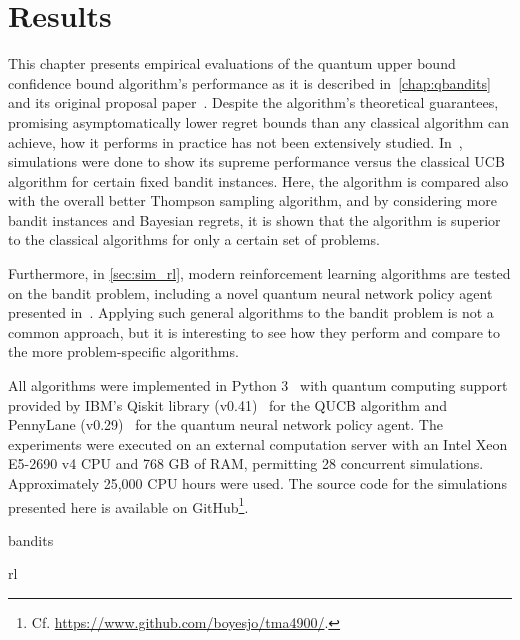 \chapter{Results}
\label{chap:simulations}

This chapter presents empirical evaluations of the quantum upper bound confidence bound algorithm's performance as it is described in~\cref{chap:qbandits} and its original proposal paper~\autocite{wan2022}.
Despite the algorithm's theoretical guarantees, promising asymptomatically lower regret bounds than any classical algorithm can achieve, how it performs in practice has not been extensively studied.
In~\autocite{wan2022}, simulations were done to show its supreme performance versus the classical UCB algorithm for certain fixed bandit instances.
Here, the algorithm is compared also with the overall better Thompson sampling algorithm, and by considering more bandit instances and Bayesian regrets, it is shown that the algorithm is superior to the classical algorithms for only a certain set of problems.

Furthermore, in \cref{sec:sim_rl}, modern reinforcement learning algorithms are tested on the bandit problem, including a novel quantum neural network policy agent presented in~\autocite{jerbi2021a}.
Applying such general algorithms to the bandit problem is not a common approach, but it is interesting to see how they perform and compare to the more problem-specific algorithms.

All algorithms were implemented in Python 3~\autocite{python} with quantum computing support provided by IBM's Qiskit library (v0.41)~\autocite{qiskit} for the QUCB algorithm and PennyLane (v0.29)~\autocite{pennylane} for the quantum neural network policy agent.
The experiments were executed on an external computation server with an Intel Xeon E5-2690 v4 CPU and 768 GB of RAM, permitting 28 concurrent simulations.
Approximately 25,000 CPU hours were used.
The source code for the simulations presented here is available on GitHub\footnote{
    Cf. \url{https://www.github.com/boyesjo/tma4900/}.
}.

\clearpage


{bandits}
\clearpage



{rl}

\clearpage
